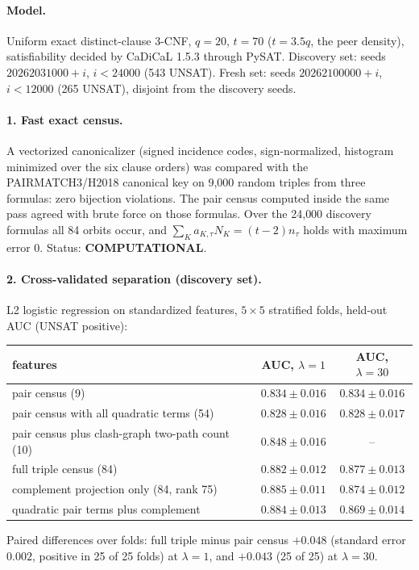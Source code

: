 \documentclass[11pt]{article}
\begin{document}
\paragraph{Model.} Uniform exact distinct-clause 3-CNF, $q=20$, $t=70$ ($t=3.5q$, the peer density), satisfiability decided by CaDiCaL 1.5.3 through PySAT. Discovery set: seeds $20262031000+i$, $i<24000$ (543 UNSAT). Fresh set: seeds $20262100000+i$, $i<12000$ (265 UNSAT), disjoint from the discovery seeds.

\paragraph{1. Fast exact census.} A vectorized canonicalizer (signed incidence codes, sign-normalized, histogram minimized over the six clause orders) was compared with the PAIRMATCH3/H2018 canonical key on 9{,}000 random triples from three formulas: zero bijection violations. The pair census computed inside the same pass agreed with brute force on those formulas. Over the 24{,}000 discovery formulas all 84 orbits occur, and $\sum_K a_{K,\tau}N_K=(t-2)n_\tau$ holds with maximum error 0. Status: \textbf{COMPUTATIONAL}.

\paragraph{2. Cross-validated separation (discovery set).} L2 logistic regression on standardized features, $5\times5$ stratified folds, held-out AUC (UNSAT positive):
\begin{center}\begin{tabular}{lcc}\toprule
features & AUC, $\lambda=1$ & AUC, $\lambda=30$\\\midrule
pair census (9) & $0.834\pm0.016$ & $0.834\pm0.016$\\
pair census with all quadratic terms (54) & $0.828\pm0.016$ & $0.828\pm0.017$\\
pair census plus clash-graph two-path count (10) & $0.848\pm0.016$ & --\\
full triple census (84) & $0.882\pm0.012$ & $0.877\pm0.013$\\
complement projection only (84, rank 75) & $0.885\pm0.011$ & $0.874\pm0.012$\\
quadratic pair terms plus complement & $0.884\pm0.013$ & $0.869\pm0.014$\\\bottomrule
\end{tabular}\end{center}
Paired differences over folds: full triple minus pair census $+0.048$ (standard error $0.002$, positive in 25 of 25 folds) at $\lambda=1$, and $+0.043$ (25 of 25) at $\lambda=30$.
\end{document}
